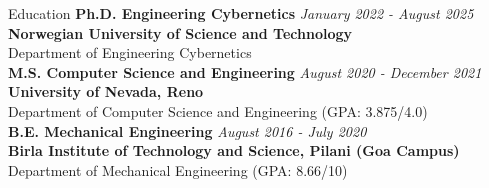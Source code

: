 \documentclass{resume} %
\begin{document}

\begin{rSection}{Education}
{\bf Ph.D. Engineering Cybernetics } \hfill {\em January 2022 - August 2025}
\\{\bf Norwegian University of Science and Technology}
\\ Department of Engineering Cybernetics\\
{\bf M.S. Computer Science and Engineering} \hfill {\em August 2020 - December 2021}
\\{\bf University of Nevada, Reno}
\\ Department of Computer Science and Engineering \hfill
(GPA: 3.875/4.0) \\
{\bf B.E. Mechanical Engineering} \hfill {\em August 2016 - July 2020} 
\\{\bf Birla Institute of Technology and Science, Pilani (Goa Campus)} 
\\ Department of Mechanical Engineering \hfill
(GPA: 8.66/10)


\end{rSection}



\end{document}
